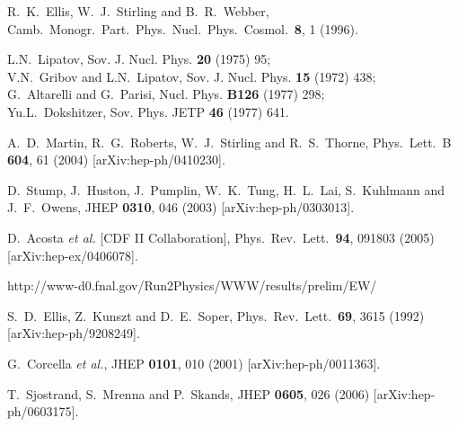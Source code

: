 \documentclass[12pt]{iopart}
\begin{document}
\begin{thebibliography}{99}
  R.~K.~Ellis, W.~J.~Stirling and B.~R.~Webber,
  Camb.\ Monogr.\ Part.\ Phys.\ Nucl.\ Phys.\ Cosmol.\  {\bf 8}, 1 (1996).


L.N.~Lipatov, Sov. J. Nucl. Phys. {\bf 20} (1975) 95; \\
V.N.~Gribov and L.N.~Lipatov, Sov. J. Nucl. Phys. {\bf 15} (1972) 438; \\
G.~Altarelli and G.~Parisi, Nucl. Phys. {\bf B126} (1977) 298; \\
Yu.L.~Dokshitzer, Sov. Phys. JETP {\bf 46} (1977) 641.

  A.~D.~Martin, R.~G.~Roberts, W.~J.~Stirling and R.~S.~Thorne,
  Phys.\ Lett.\ B {\bf 604}, 61 (2004)
  [arXiv:hep-ph/0410230].



  D.~Stump, J.~Huston, J.~Pumplin, W.~K.~Tung, H.~L.~Lai, S.~Kuhlmann and J.~F.~Owens,
  JHEP {\bf 0310}, 046 (2003)
  [arXiv:hep-ph/0303013].

  D.~Acosta {\it et al.}  [CDF II Collaboration],
  Phys.\ Rev.\ Lett.\  {\bf 94}, 091803 (2005)
  [arXiv:hep-ex/0406078].

 http://www-d0.fnal.gov/Run2Physics/WWW/results/prelim/EW/


  S.~D.~Ellis, Z.~Kunszt and D.~E.~Soper,
  Phys.\ Rev.\ Lett.\  {\bf 69}, 3615 (1992)
  [arXiv:hep-ph/9208249].

  G.~Corcella {\it et al.},
  JHEP {\bf 0101}, 010 (2001)
  [arXiv:hep-ph/0011363].

  T.~Sjostrand, S.~Mrenna and P.~Skands,
  JHEP {\bf 0605}, 026 (2006)
  [arXiv:hep-ph/0603175].


\end{thebibliography}
\end{document}
